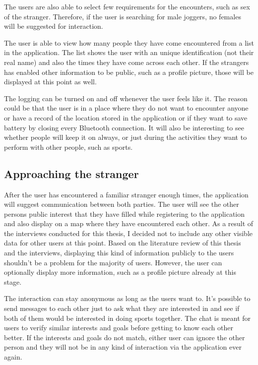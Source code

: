 The users are also able to select few requirements for the encounters, such as sex of the stranger. Therefore, if the user is searching for male joggers, no females will be suggested for interaction.

The user is able to view how many people they have come encountered from a list in the application. The list shows the user with an unique identification (not their real name) and also the times they have come across each other. If the strangers has enabled other information to be public, such as a profile picture, those will be displayed at this point as well.

The logging can be turned on and off whenever the user feels like it. The reason could be that the user is in a place where they do not want to encounter anyone or have a record of the location stored in the application or if they want to save battery by closing every Bluetooth connection. It will also be interesting to see whether people will keep it on always, or just during the activities they want to perform with other people, such as sports.

\subsection{Approaching the stranger}

After the user has encountered a familiar stranger enough times, the application will suggest communication between both parties. The user will see the other persons public interest that they have filled while registering to the application and also display on a map where they have encountered each other. As a result of the interviews conducted for this thesis, I decided not to include any other visible data for other users at this point. Based on the literature review of this thesis and the interviews, displaying this kind of information publicly to the users shouldn't be a problem for the majority of users. However, the user can optionally display more information, such as a profile picture already at this stage.

The interaction can stay anonymous as long as the users want to. It's possible to send messages to each other just to ask what they are interested in and see if both of them would be interested in doing sports together. The chat is meant for users to verify similar interests and goals before getting to know each other better. If the interests and goals do not match, either user can ignore the other person and they will not be in any kind of interaction via the application ever again.

